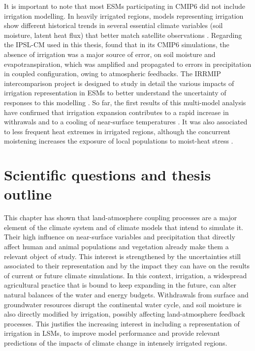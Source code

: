 It is important to note that most ESMs participating in CMIP6 did not include irrigation modelling. In heavily irrigated regions, models representing irrigation show different historical trends in several essential climate variables (soil moisture, latent heat flux) that better match satellite observations \citep{al-yaari_role_2022}. 
Regarding the IPSL-CM used in this thesis, \citet{mizuochi_multi-variable_2020} found that in its CMIP6 simulations, the absence of irrigation was a major source of error, on soil moisture and evapotranspiration, which was amplified and propagated to errors in precipitation in coupled configuration, owing to atmospheric feedbacks.
The IRRMIP intercomparison project is designed to study in detail the various impacts of irrigation representation in ESMs to better understand the uncertainty of responses to this modelling \citep{yao_irrigation-expansion-induced_2023}. So far, the first results of this multi-model analysis have confirmed that irrigation expansion contributes to a rapid increase in withrawals and to a cooling of near-surface temperatures \citep{yao_impacts_2025}. It was also associated to less frequent heat extremes in irrigated regions, although the concurrent moistening increases the exposure of local populations to moist-heat stress \citep{yao_impacts_2025-1}.

\section{Scientific questions and thesis outline}

This chapter has shown that land-atmosphere coupling processes are a major element of the climate system and of climate models that intend to simulate it. 
Their high influence on near-surface variables and precipitation that directly affect human and animal populations and vegetation already make them a relevant object of study. This interest is strengthened by the uncertainties still associated to their representation and by the impact they can have on the results of current or future climate simulations. 
In this context, irrigation, a widespread agricultural practice that is bound to keep expanding in the future, can alter natural balances of the water and energy budgets.
Withdrawals from surface and groundwater resources disrupt the continental water cycle, and soil moisture is also directly modified by irrigation, possibly affecting land-atmosphere feedback processes.
This justifies the increasing interest in including a representation of irrigation in LSMs, to improve model performance and provide relevant predictions of the impacts of climate change in intensely irrigated regions.

